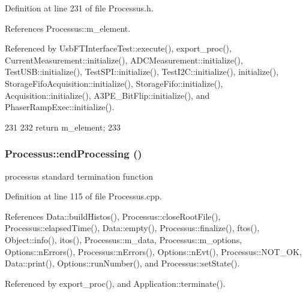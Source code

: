 Definition at line 231 of file Processus.h.

References Processus::m\_\-element.

Referenced by UsbFTInterfaceTest::execute(), export\_\-proc(), CurrentMeasurement::initialize(), ADCMeasurement::initialize(), TestUSB::initialize(), TestSPI::initialize(), TestI2C::initialize(), initialize(), StorageFifoAcquisition::initialize(), StorageFifo::initialize(), Acquisition::initialize(), A3PE\_\-BitFlip::initialize(), and PhaserRampExec::initialize().


\begin{DoxyCode}
231                       {
232     return m_element;
233   }
\end{DoxyCode}
\hypertarget{classProcessus_a5e4da662989d356b89d490b89c7afbfd}{
\subsubsection[{endProcessing}]{ Processus::endProcessing ()}}
\label{classProcessus_a5e4da662989d356b89d490b89c7afbfd}
processus standard termination function 

Definition at line 115 of file Processus.cpp.

References Data::buildHistos(), Processus::closeRootFile(), Processus::elapsedTime(), Data::empty(), Processus::finalize(), ftos(), Object::info(), itos(), Processus::m\_\-data, Processus::m\_\-options, Options::nErrors(), Processus::nErrors(), Options::nEvt(), Processus::NOT\_\-OK, Data::print(), Options::runNumber(), and Processus::setState().

Referenced by export\_\-proc(), and Application::terminate().


